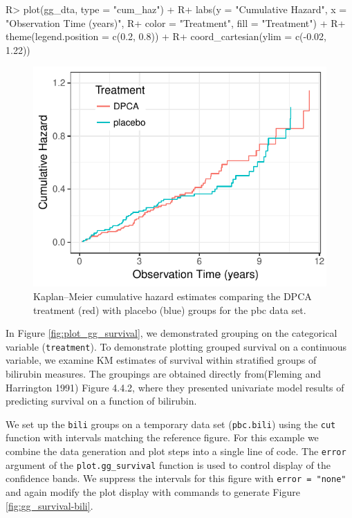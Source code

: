 \documentclass[article]{jss}
\begin{document}
\begin{Schunk}
\begin{Sinput}
R> plot(gg_dta, type = "cum_haz") +
R+   labs(y = "Cumulative Hazard", x = "Observation Time (years)",
R+        color = "Treatment", fill = "Treatment") +
R+   theme(legend.position = c(0.2, 0.8)) +
R+   coord_cartesian(ylim = c(-0.02, 1.22))
\end{Sinput}
\begin{figure}[!htb]

{\centering \includegraphics{fig-rfs/rfs-plot_gg_cum_hazard-1} 

}

\caption[Kaplan--Meier cumulative hazard estimates comparing the DPCA treatment (red) with placebo (blue) groups for the pbc data set]{Kaplan--Meier cumulative hazard estimates comparing the DPCA treatment (red) with placebo (blue) groups for the pbc data set.}\label{fig:plot_gg_cum_hazard}
\end{figure}
\end{Schunk}

In Figure \ref{fig:plot_gg_survival}, we demonstrated grouping on the
categorical variable (\texttt{treatment}). To demonstrate plotting
grouped survival on a continuous variable, we examine KM estimates of
survival within stratified groups of bilirubin measures. The groupings
are obtained directly from(Fleming and Harrington 1991) Figure 4.4.2,
where they presented univariate model results of predicting survival on
a function of bilirubin.

We set up the \texttt{bili} groups on a temporary data set
(\texttt{pbc.bili}) using the \texttt{cut} function with intervals
matching the reference figure. For this example we combine the data
generation and plot steps into a single line of code. The \texttt{error}
argument of the \texttt{plot.gg\_survival} function is used to control
display of the confidence bands. We suppress the intervals for this
figure with \texttt{error\ =\ "none"} and again modify the plot display
with  commands to generate Figure
\ref{fig:gg_survival-bili}.
\end{document}
